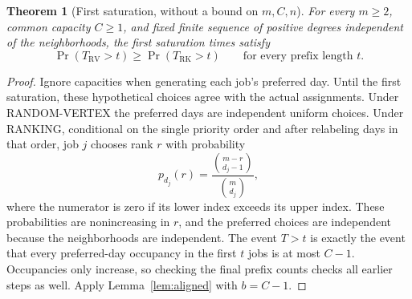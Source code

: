 \documentclass[11pt]{article}
\newtheorem{theorem}{Theorem}
\newcommand{\RV}{\mathrm{RV}}
\newcommand{\RK}{\mathrm{RK}}
\begin{document}
\begin{theorem}[First saturation, without a bound on $m,C,n$]\label{thm:first}
For every $m\geq2$, common capacity $C\geq1$, and fixed finite sequence
of positive degrees independent of the neighborhoods, the first saturation
times satisfy
\[
 \Pr(T_\RV>t)\geq\Pr(T_\RK>t)\qquad\text{for every prefix length }t.
\]
\end{theorem}
\begin{proof}
Ignore capacities when generating each job's preferred day. Until the first
saturation, these hypothetical choices agree with the actual assignments.
Under RANDOM-VERTEX the preferred days are independent uniform choices.
Under RANKING, conditional on the single priority order and after relabeling
days in that order, job $j$ chooses rank $r$ with probability
\[
 p_{d_j}(r)=\frac{\binom{m-r}{d_j-1}}{\binom m{d_j}},
\]
where the numerator is zero if its lower index exceeds its upper index.
These probabilities are nonincreasing in $r$, and the preferred choices
are independent because the neighborhoods are independent. The event
$T>t$ is exactly the event that every preferred-day occupancy in the
first $t$ jobs is at most $C-1$. Occupancies only increase, so checking
the final prefix counts checks all earlier steps as well.
Apply Lemma~\ref{lem:aligned} with $b=C-1$.
\end{proof}
\end{document}

